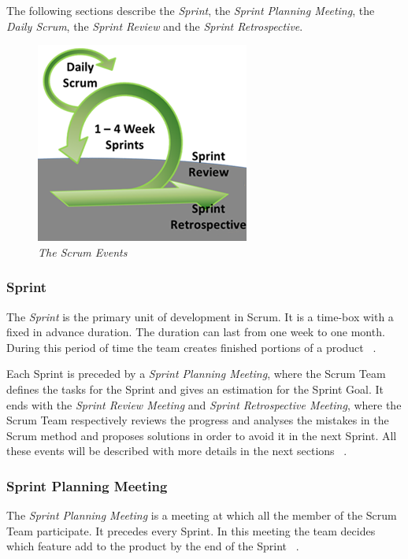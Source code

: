 			The following sections describe the \emph{Sprint}, the \emph{Sprint Planning Meeting}, the \emph{Daily Scrum}, the \emph{Sprint Review} and the \emph{Sprint Retrospective}.

			\begin{figure}[h]
			  \begin{center} 
			    \includegraphics[scale=0.8]{images/ch_04/scrum_events.png}
			  \end{center} 
			  \caption{\textit{The Scrum Events}}  
			  \label{fig:ScrumEvents}
		  	\end{figure}
			


			
			\subsubsection{Sprint}\label{ref_scrum_sprint}
			The \emph{Sprint} is the primary unit of development in Scrum. It is a time-box with a fixed in advance duration. The duration can last from one week to one month. During this period of time the team creates finished portions of a product ~\cite{scrumEnglishGuide}. 
	
			Each Sprint is preceded by a \emph{Sprint Planning Meeting}, where the Scrum Team defines the tasks for the Sprint and gives an estimation for the Sprint Goal. It ends with the \emph{Sprint Review Meeting} and \emph{Sprint Retrospective Meeting}, where the Scrum Team respectively reviews the progress and analyses the mistakes in the Scrum method and proposes solutions in order to avoid it in the next Sprint. All these events will be described with more details in the next sections ~\cite{scrumEnglishGuide}.  


			\subsubsection{Sprint Planning Meeting}\label{ref_scrum_sprint_plan}
			The \emph{Sprint Planning Meeting} is a meeting at which all the member of the Scrum Team participate. It precedes every Sprint. In this meeting the team decides which feature add to the product by the end of the Sprint ~\cite{scrumEnglishGuide}.


